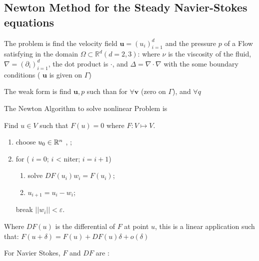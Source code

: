 \documentclass[a4paper,twoside,12pt]{book}
\def\p{\partial}
\begin{document}
\subsection{Newton Method for the Steady Navier-Stokes equations}

The problem is find the velocity field $\bm{u}=(u_i)_{i=1}^d$ and the pressure $p$ of a Flow 
satisfying in the domain $\Omega \subset  \mathbb{R}^d (d=2,3)$:
where $\nu$ is the viscosity of the fluid, $\nabla = (\p_i )_{i=1}^d $, the dot product is $\cdot$, and  $\Delta = \nabla\cdot\nabla$
with the some boundary conditions ( $\bm{u}$ is  given on $\Gamma$)

\bigskip

The weak form is 
find $\bm{u}, p $ such than for $\forall \bm{v}$ (zero on $\Gamma$), and $\forall  q$ 


The Newton Algorithm to solve nonlinear Problem is

Find  $u\in  V$ such that $F(u)=0$ where 
$ F : V \mapsto V $. 

\begin{enumerate} 
\item choose $u_0\in \mathbb{R}^n $ , ;
\item for ( $i =0$; $i$ < niter; $i = i+1$) 

\begin{enumerate}
\item solve $DF(u_i) w_i =  F(u_i)$;
\item $u_{i+1} = u_i - w_i$;  
\end{enumerate}
break  $|| w_i|| < \varepsilon$.
\end{enumerate}

Where $DF(u)$ is the differential of $F$ at point  $u$, this is a linear application such that:
{$
  F(u+\delta) = F(u) + DF(u) \delta + o(\delta) 
$}


For Navier Stokes, $F$ and $DF$ are  :
\end{document}
